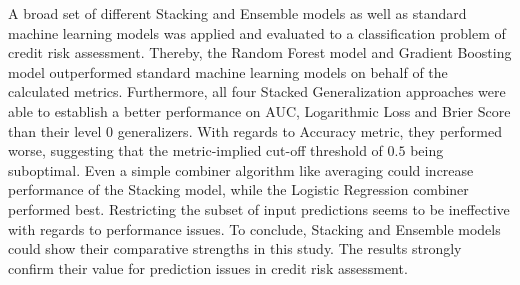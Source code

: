 \documentclass[12pt]{article}
\begin{document}
A broad set of different Stacking and Ensemble models as well as standard machine learning models was applied and evaluated to a classification problem of credit risk assessment. Thereby, the Random Forest model and Gradient Boosting model outperformed standard machine learning models on behalf of the calculated metrics. Furthermore, all four Stacked Generalization approaches were able to establish a better performance on AUC, Logarithmic Loss and Brier Score than their level 0 generalizers. With regards to Accuracy metric, they performed worse, suggesting that the metric-implied cut-off threshold of $0.5$ being suboptimal. Even a simple combiner algorithm like averaging could increase performance of the Stacking model, while the Logistic Regression combiner performed best. Restricting the subset of input predictions seems to be ineffective with regards to performance issues. To conclude, Stacking and Ensemble models could show their comparative strengths in this study. The results strongly confirm their value for prediction issues in credit risk assessment.
\end{document}
